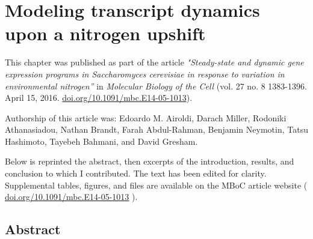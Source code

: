 \chapter{Modeling transcript dynamics upon a nitrogen upshift}

This chapter was published as part of the article 
\textit{"Steady-state and dynamic gene expression programs in 
Saccharomyces cerevisiae in response to variation in 
environmental nitrogen”} in \textit{Molecular Biology of the Cell}
(vol. 27 no. 8 1383-1396. April 15, 2016.
\url{doi.org/10.1091/mbc.E14-05-1013}).

Authorship of this article was: Edoardo M. Airoldi, Darach Miller,
Rodoniki Athanasiadou, Nathan Brandt, Farah Abdul-Rahman, Benjamin
Neymotin, Tatsu Hashimoto, Tayebeh Bahmani, and David Gresham. 

Below is reprinted the abstract, then excerpts of the introduction,
results, and conclusion to which I contributed. 
The text has been edited for clarity. Supplemental tables,
figures, and files are available on the MBoC article website (
\url{doi.org/10.1091/mbc.E14-05-1013} ).  

\section{Abstract} 

